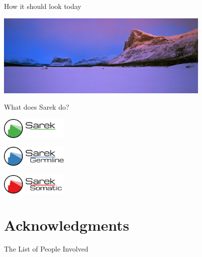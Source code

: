 \documentclass{beamer}
\begin{document}
\begin{frame}{How it should look today}
	\begin{center}
		\includegraphics[height=4cm]{pictures/Skierfe-winter.jpg}
	\end{center}
\end{frame}

\begin{frame}{What does Sarek do?}
	\begin{center}
		\includegraphics[height=1cm]{pictures/Sarek}
	\end{center}
	\pause
	\begin{center}
		\includegraphics[height=1cm]{pictures/Sarek_germline}
	\end{center}
	\pause
	\begin{center}
		\includegraphics[height=1cm]{pictures/Sarek_somatic}
	\end{center}
\end{frame}

\section{Acknowledgments}

\begin{frame}{The List of People Involved}
	\begin{table}
	\end{table}
\end{frame}
\end{document}
